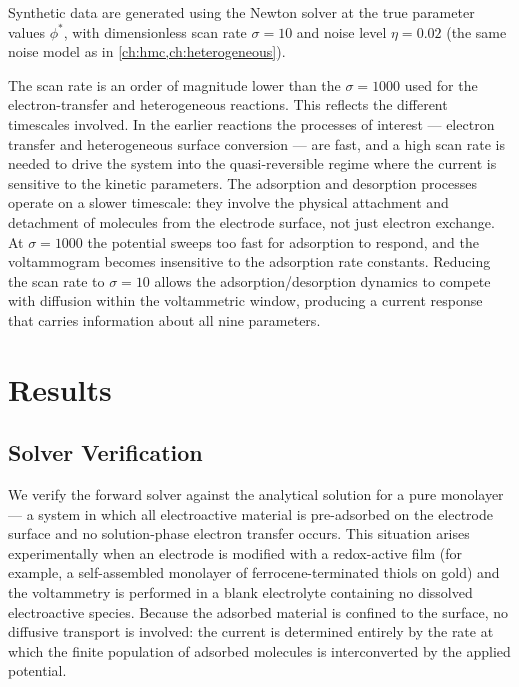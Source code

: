 Synthetic data are generated using the Newton solver at the true
parameter values
$\phi^*$,
with dimensionless scan rate $\sigma = 10$ and noise level
$\eta = 0.02$ (the same noise model as in
\cref{ch:hmc,ch:heterogeneous}).

The scan rate is an order of magnitude lower than the $\sigma = 1000$
used for the electron-transfer and heterogeneous reactions. This
reflects the different timescales involved. In the earlier reactions the
processes of interest --- electron transfer and heterogeneous surface
conversion --- are fast, and a high scan rate is needed to drive the
system into the quasi-reversible regime where the current is sensitive
to the kinetic parameters. The adsorption and desorption processes
operate on a slower timescale: they involve the physical attachment and
detachment of molecules from the electrode surface, not just electron
exchange. At $\sigma = 1000$ the potential sweeps too fast for
adsorption to respond, and the voltammogram becomes insensitive to the
adsorption rate constants. Reducing the scan rate to $\sigma = 10$
allows the adsorption/desorption dynamics to compete with diffusion
within the voltammetric window, producing a current response that
carries information about all nine parameters.

\section{Results}\label{sec:ads-results}

\subsection{Solver Verification}\label{sec:ads-verification}

We verify the forward solver against the analytical solution for a
pure monolayer --- a system in which all electroactive material is
pre-adsorbed on the electrode surface and no solution-phase electron
transfer occurs. This situation arises experimentally when an electrode
is modified with a redox-active film (for example, a self-assembled
monolayer of ferrocene-terminated thiols on gold) and the voltammetry
is performed in a blank electrolyte containing no dissolved
electroactive species. Because the adsorbed material is confined to the
surface, no diffusive transport is involved: the current is determined
entirely by the rate at which the finite population of adsorbed
molecules is interconverted by the applied potential.

